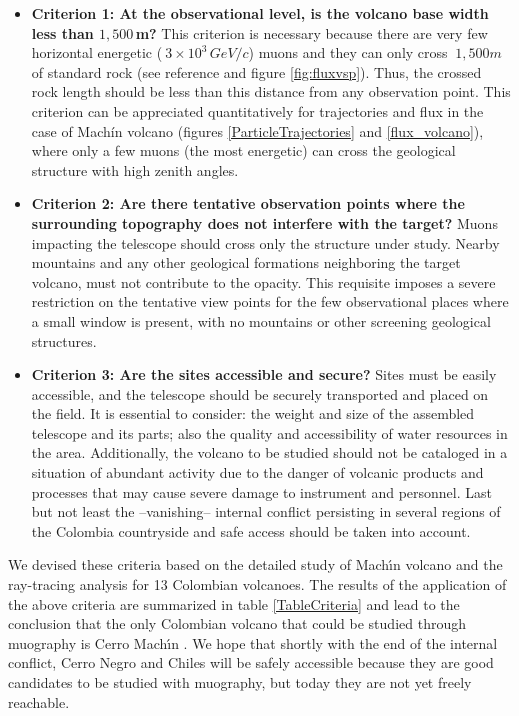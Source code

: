 \documentclass[letterpaper,10pt,titlepage,linenumber]{article}
\begin{document}
\begin{itemize}
\item \textbf{Criterion 1: At the observational level, is the volcano base width less than $1,500$\,m?} This criterion is necessary because there are very few horizontal energetic ($~3 \times 10^3 \, GeV/c$) muons and they can only cross $~1,500m$ of standard rock (see reference \cite{NishiyamaEtal2016} and figure \ref{fig:fluxvsp}). Thus, the crossed rock length should be less than this distance from any observation point. This criterion can be appreciated quantitatively for trajectories and flux in the case of Machín volcano (figures \ref{ParticleTrajectories} and  \ref{flux_volcano}), where only a few muons (the most energetic) can cross the geological structure with high zenith angles.

\item \textbf{Criterion 2: Are there tentative observation points where the surrounding topography does not interfere with  the target?} Muons impacting the telescope should cross only the structure under study. Nearby mountains and any other geological formations neighboring the target volcano, must not contribute to the opacity. This requisite imposes a severe restriction on the tentative view points for the few observational places where a small window is present, with no mountains or other screening geological structures.

\item \textbf{Criterion 3: Are the sites accessible and secure?} Sites must be easily accessible, and the telescope should be securely transported and placed on the field. It is essential to consider: the weight and size of the assembled telescope and its parts; also the quality and accessibility of water resources in the area. Additionally, the volcano to be studied should not be cataloged in a situation of abundant activity due to the danger of volcanic products and processes that may cause severe damage to instrument and personnel. Last but not least the --vanishing-- internal conflict persisting in several regions of the Colombia countryside and safe access should be taken into account. 
\end{itemize}

We devised these criteria based on the detailed study of Mach\'{\i}n volcano and the ray-tracing analysis for 13 Colombian volcanoes. The results of the application of the above criteria are summarized in table \ref{TableCriteria} and lead to the conclusion that the only Colombian volcano that could be studied through muography is Cerro Mach\'{\i}n \cite{AsoreyEtal2017}. We hope that shortly with the end of the internal conflict, Cerro Negro and Chiles will be safely accessible because they are good candidates to be studied with muography, but today they are not yet freely reachable. 
\end{document}
